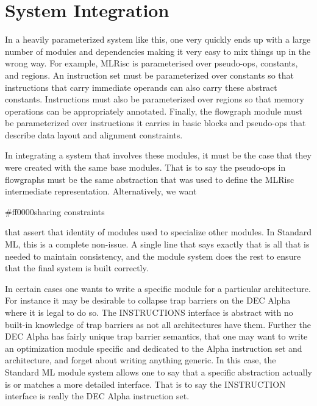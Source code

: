 \section{System Integration}
  In a heavily parameterized system like this, one very quickly ends up
  with a large number of modules and dependencies making it very
  easy to mix things up in the wrong way.  
   For example, MLRisc is parameterised over pseudo-ops,
  constants, and regions. An instruction set must be parameterized
  over constants so that instructions that carry immediate operands
  can also carry these abstract constants. Instructions must also be
  parameterized over regions so that memory operations can be
  appropriately annotated. Finally, the flowgraph module must be
  parameterized over instructions it carries in basic blocks and
  pseudo-ops that describe data layout and alignment constraints.

  In integrating a system that involves these modules, it must be the
  case that they were created with the same base modules. That is to
  say the pseudo-ops in flowgraphs must be the same abstraction that
  was used to define the MLRisc intermediate
  representation. Alternatively, we want 
  \begin{color}{#ff0000}sharing constraints\end{color} 
  that assert that identity of modules used to
  specialize other modules. In Standard ML, this is a complete
  non-issue. A single line that says exactly that is all that is
  needed to maintain consistency, and the module system does the rest
  to ensure that the final system is built correctly.

  In certain cases one wants to write a specific module for a
  particular architecture. For instance it may be desirable to collapse
  trap barriers on the DEC Alpha where it is legal to do so. The
  INSTRUCTIONS interface is abstract with no built-in knowledge of 
  trap barriers as not all architectures have them.
  Further the DEC Alpha has fairly unique trap barrier semantics,
  that one may want to write an optimization module specific and
  dedicated to the Alpha instruction set and architecture, and forget
  about writing anything generic. In this case, the Standard ML module
  system allows one to say that a specific abstraction actually is or
  matches a more detailed interface. That is to say the INSTRUCTION
  interface is really the DEC Alpha instruction set.
